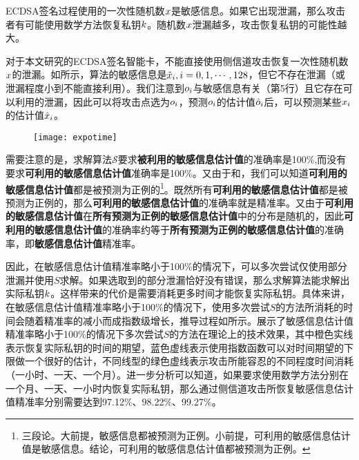 {	ECDSA签名过程使用的一次性随机数$x$是敏感信息。如果它出现泄漏，那么攻击者有可能使用数学方法恢复私钥$k$。随机数$x$泄漏越多，攻击恢复私钥的可能性越大。
	
	对于本文研究的ECDSA签名智能卡，不能直接使用侧信道攻击恢复一次性随机数$x$的泄漏。如所示，算法的敏感信息是$\tilde{x}_i,i=0,1,\cdots, 128$，但它不存在泄漏（或泄漏程度小到不能直接利用）。我们注意到$o_i$与敏感信息有关（第5行）且它存在可以利用的泄漏，因此可以将攻击点选为$o_i$，预测$o_i$的估计值$\hat{o}_i$后，可以预测某些$x_i$的估计值$\hat{x}_i$。
	
	\begin{figure}[!h]
		\begin{center}
			\texttt{[image: expotime]}
			\label{fig:expotime}
		\end{center}
	\end{figure}
	
	需要注意的是，求解算法$\mathcal S$要求\textbf{被利用的敏感信息估计值}的准确率是100\%,而没有要求\textbf{可利用的敏感信息估计值}准确率是100\%。又由于和，我们可以知道\textbf{可利用的敏感信息估计值}都是被预测为正例的\footnote{三段论。大前提，敏感信息都被预测为正例。小前提，可利用的敏感信息估计值是敏感信息。结论，可利用的敏感信息估计值都被预测为正例。}。既然所有\textbf{可利用的敏感信息估计值}都是被预测为正例的，那么\textbf{可利用的敏感信息估计值}的准确率就是精准率。又由于\textbf{可利用的敏感信息估计值}在\textbf{所有预测为正例的敏感信息估计值}中的分布是随机的，因此\textbf{可利用的敏感信息估计值}的准确率约等于\textbf{所有预测为正例的敏感信息估计值}的准确率，即\textbf{敏感信息估计值}精准率。
	
	因此，在敏感信息估计值精准率略小于100\%的情况下，可以多次尝试仅使用部分泄漏并使用$S$求解。如果选取到的部分泄漏恰好没有错误，那么求解算法能求解出实际私钥$k$。这样带来的代价是需要消耗更多时间才能恢复实际私钥。具体来讲，在敏感信息估计值精准率略小于100\%的情况下，使用多次尝试$S$的方法所消耗的时间会随着精准率的减小而成指数级增长，推导过程如所示。展示了敏感信息估计值精准率略小于100\%的情况下多次尝试$S$的方法在理论上的技术效果，其中橙色实线表示恢复实际私钥的时间的期望，蓝色虚线表示使用指数函数可以对时间期望的下限做一个很好的估计，不同线型的绿色虚线表示攻击所能容忍的不同程度时间消耗（一小时、一天、一个月）。进一步分析可以知道，如果要求使用数学方法分别在一个月、一天、一小时内恢复实际私钥，那么通过侧信道攻击所恢复敏感信息估计值精准率分别需要达到97.12\%、98.22\%、99.27\%。

}
